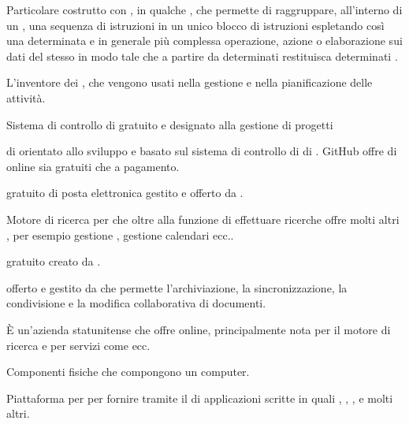{Particolare costrutto con , in qualche , che permette di raggruppare, all'interno di un , una sequenza di istruzioni in un unico blocco di istruzioni espletando così una determinata e in generale più complessa operazione, azione o elaborazione sui dati del  stesso in modo tale che a partire da determinati  restituisca determinati .}



{L'inventore dei , che vengono usati nella gestione e nella pianificazione delle attività.}


{Sistema di controllo di   gratuito e  designato alla gestione di progetti }


{ di   orientato allo sviluppo  e basato sul sistema di controllo di  di . GitHub offre  di  online sia gratuiti che a pagamento.}


{ gratuito di posta elettronica gestito e offerto da .}

{Motore di ricerca per  che oltre alla funzione di effettuare ricerche offre molti altri , per esempio gestione , gestione calendari ecc..} 


{  gratuito creato da .}


{ offerto e gestito da  che permette l'archiviazione, la sincronizzazione, la condivisione e la modifica collaborativa di documenti.}

{\`{E} un'azienda statunitense che offre  online, principalmente nota per il motore di ricerca  e per servizi come  ecc.}



{Componenti fisiche che compongono un computer.}


{Piattaforma  per per fornire  tramite il  di applicazioni scritte in  quali , , , e molti altri.}


